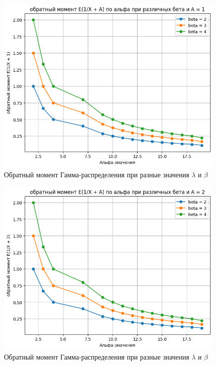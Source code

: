 \documentclass[13pt]{article}
\begin{document}
\vspace{10 mm}
\begin{figure}[htp]
    \centering
    \includegraphics[width=11 cm]{images/gamma2.png}
    \caption{ Обратный момент Гамма-распределения при разные значения $\lambda$ и $\beta$ }
    \label{gamma_fig2}
\end{figure}
\vspace{10 mm}

\begin{figure}[htp]
    \centering
    \includegraphics[width=11.5 cm]{images/gamma3.png}
    \caption{ Обратный момент Гамма-распределения при разные значения $\lambda$ и $\beta$ }
    \label{gamma_fig3}
\end{figure}




\end{document}
